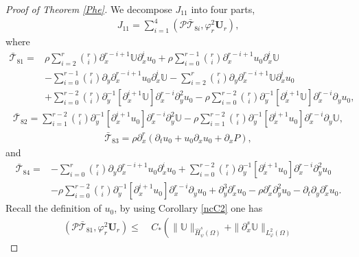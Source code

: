\documentclass[10pt,a4paper]{amsart}
\begin{document}
\begin{proof}[Proof of Theorem \ref{Phe}]
We decompose $J_{11}$ into four parts,
\begin{align}\label{J11}
J_{11}
=\sum_{i=1}^{4}(\mathcal{P}\bar{\mathcal{T}}_{8i},\varphi_{r}^{2}\mathbf{U}_{r}),
\end{align}
where
\begin{align*}
\bar{\mathcal{T}}_{81}
=& \rho\sum_{i=2}^{r}\binom{r}{i}\partial_{x}^{r-i+1}\mathbb{U}\partial_{x}^{i}u_{0}
  +\rho\sum_{i=0}^{r-1}\binom{r}{i}\partial_{x}^{r-i+1}u_{0}\partial_{x}^{i}\mathbb{U}\\
 &-\sum_{i=0}^{r-1}\binom{r}{i}\partial_{y}\partial_{x}^{r-i+1}u_{0}\partial_{x}^{i}\mathbb{U}
  -\sum_{i=2}^{r}\binom{r}{i}\partial_{y}\partial_{x}^{r-i+1}\mathbb{U}\partial_{x}^{i}u_{0}\\
 &+\sum_{i=0}^{r-2}\binom{r}{i}\partial_{y}^{-1}[\partial_{x}^{i+1}\mathbb{U}]\partial_{x}^{r-i}\partial_{y}^{2}u_{0}
  -\rho\sum_{i=0}^{r-2}\binom{r}{i}\partial_{y}^{-1}[\partial_{x}^{i+1}\mathbb{U}]\partial_{x}^{r-i}\partial_{y}u_{0},
\end{align*}
\begin{align*}
\bar{\mathcal{T}}_{82}
= \sum_{i=1}^{r-2}\binom{r}{i}\partial_{y}^{-1}[\partial_{x}^{i+1}u_{0}]\partial_{x}^{r-i}\partial_{y}^{2}\mathbb{U}
  -\rho\sum_{i=1}^{r-2}\binom{r}{i}\partial_{y}^{-1}[\partial_{x}^{i+1}u_{0}]\partial_{x}^{r-i}\partial_{y}\mathbb{U},
\end{align*}
\begin{align*}
\bar{\mathcal{T}}_{83}
=\rho\partial_{x}^{r}(\partial_{t}u_{0}+u_{0}\partial_{x}u_{0}+\partial_{x}P),
\end{align*}
and
\begin{align*}
\bar{\mathcal{T}}_{84}
=&-\sum_{i=0}^{r}\binom{r}{i}\partial_{y}\partial_{x}^{r-i+1}u_{0}\partial_{x}^{i}u_{0}
  +\sum_{i=0}^{r-2}\binom{r}{i}\partial_{y}^{-1}[\partial_{x}^{i+1}u_{0}]\partial_{x}^{r-i}\partial_{y}^{2}u_{0}\\
 &-\rho\sum_{i=0}^{r-2}\binom{r}{i}\partial_{y}^{-1}[\partial_{x}^{i+1}u_{0}]\partial_{x}^{r-i}\partial_{y}u_{0}
  +\partial_{y}^{3}\partial_{x}^{r}u_{0}
  -\rho\partial_{x}^{r}\partial_{y}^{2}u_{0}
  -\partial_{t}\partial_{y}\partial_{x}^{r}u_{0}.
\end{align*}
Recall the definition of $u_{0}$, by using Corollary \ref{ncC2} one has
\begin{align}\label{J111}
(\mathcal{P}\bar{\mathcal{T}}_{81},\varphi_{r}^{2}\mathbf{U}_{r})
\leq&~C_{*}\left(\|\mathbb{U}\|_{\hat{H}_{\psi}^{s}(\Omega)}+\|\partial_{x}^{s}\mathbb{U}\|_{L_{\varphi}^{2}(\Omega)}

\end{align}
\end{proof}
\end{document}
